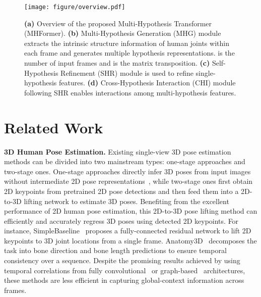 \documentclass[10pt,twocolumn,letterpaper]{article}
\def\VspaceL{\vspace{-0.40cm}}
\begin{document}
\begin{figure*}[htb]
  \centering
  \texttt{[image: figure/overview.pdf]}
  \caption
  {\textbf{(a)} Overview of the proposed Multi-Hypothesis Transformer (MHFormer). 
  \textbf{(b)} Multi-Hypothesis Generation (MHG) module extracts the intrinsic structure information of human joints within each frame and generates multiple hypothesis representations. 
   is the number of input frames and  is the matrix transposition. 
  \textbf{(c)} Self-Hypothesis Refinement (SHR) module is used to refine single-hypothesis features. 
  \textbf{(d)} Cross-Hypothesis Interaction (CHI) module following SHR enables interactions among multi-hypothesis features. 
  }
  \label{fig:overview}
  \VspaceL
\end{figure*}

\section{Related Work} 
\noindent \textbf{3D Human Pose Estimation.}
Existing single-view 3D pose estimation methods can be divided into two mainstream types: one-stage approaches and two-stage ones. 
One-stage approaches directly infer 3D poses from input images without intermediate 2D pose representations~\cite{li20143d,pavlakos2017coarse,sun2018integral,ma2021context}, while two-stage ones first obtain 2D keypoints from pretrained 2D pose detections and then feed them into a 2D-to-3D lifting network to estimate 3D poses. 
Benefiting from the excellent performance of 2D human pose estimation, this 2D-to-3D pose lifting method can efficiently and accurately regress 3D poses using detected 2D keypoints. 
For instance, SimpleBaseline~\cite{martinez2017simple} proposes a fully-connected residual network to lift 2D keypoints to 3D joint locations from a single frame. 
Anatomy3D~\cite{chen2021anatomy} decomposes the task into bone direction and bone length predictions to ensure temporal consistency over a sequence. 
Despite the promising results achieved by using temporal correlations from fully convolutional~\cite{pavllo20193d,liu2020attention,chen2021anatomy}
or graph-based~\cite{cai2019exploiting,wang2020motion,hu2021conditional} architectures, these methods are less efficient in capturing global-context information across frames. 
\end{document}
